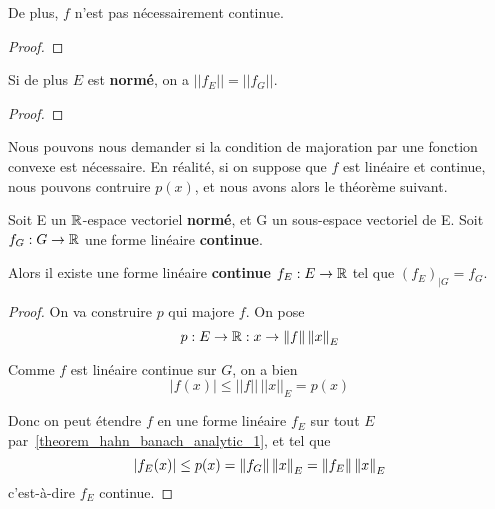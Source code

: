 De plus, $f$ n'est pas nécessairement continue.

\ifdefined\outputproof
\begin{proof}

\end{proof}
\fi

\begin{corollary}
	Si de plus $E$ est \textbf{normé}, on a $||f_{E}|| = ||f_{G}||$.
\end{corollary}

\ifdefined\outputproof
\begin{proof}

\end{proof}
\fi

Nous pouvons nous demander si la condition de majoration par une fonction
convexe est nécessaire. En réalité, si on suppose que $f$ est linéaire et
continue, nous pouvons contruire $p(x)$, et nous avons alors le théorème
suivant.

\begin{theorem} 
\label{theorem_hahn_banach_analytic_2}
	Soit E un $\mathbb{R}$-espace vectoriel \textbf{normé}, et G un sous-espace
	vectoriel de E.
	Soit $f_{G} : G \rightarrow \mathbb{R}$ une forme linéaire
	\textbf{continue}.

	Alors il existe une forme linéaire \textbf{continue}
	$f_{E} : E \rightarrow \mathbb{R}$ tel que $(f_{E})_{|G} = f_{G}$.
\end{theorem}

\ifdefined\outputproof
\begin{proof}
	On va construire $p$ qui majore $f$.
	On pose
	\begin{equation}
		p : E \rightarrow \mathbb{R} : x \rightarrow \norm{f} \,
		\norm{x}_{E}
	\end{equation}

	Comme $f$ est linéaire continue sur $G$, on a bien
	\begin{equation}
		|f(x)| \leq ||f|| \, ||x||_{E} = p(x)
	\end{equation}

	Donc on peut étendre $f$ en une forme linéaire $f_{E}$
	sur tout $E$ par~\ref{theorem_hahn_banach_analytic_1}, et tel que
	\begin{equation}
		\abs{f_{E}(x)} \leq p(x) = \norm{f_{G}} \, \norm{x}_{E} =
			\norm{f_{E}} \, \norm{x}_{E}
	\end{equation}
	c'est-à-dire $f_{E}$ continue.
\end{proof}
\fi
